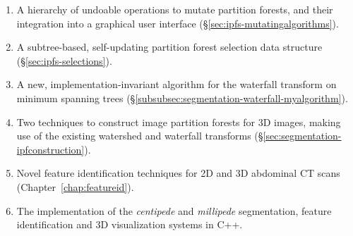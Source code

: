 \begin{enumerate}
\item A hierarchy of undoable operations to mutate partition forests, and their integration into a graphical user interface (\S\ref{sec:ipfs-mutatingalgorithms}).
\item A subtree-based, self-updating partition forest selection data structure (\S\ref{sec:ipfs-selections}).
\item A new, implementation-invariant algorithm for the waterfall transform on minimum spanning trees (\S\ref{subsubsec:segmentation-waterfall-myalgorithm}).
\item Two techniques to construct image partition forests for 3D images, making use of the existing watershed and waterfall transforms (\S\ref{sec:segmentation-ipfconstruction}).
\item Novel feature identification techniques for 2D and 3D abdominal CT scans (Chapter~\ref{chap:featureid}).
\item The implementation of the \emph{centipede} and \emph{millipede} segmentation, feature identification and 3D visualization systems in C++.
\end{enumerate}

